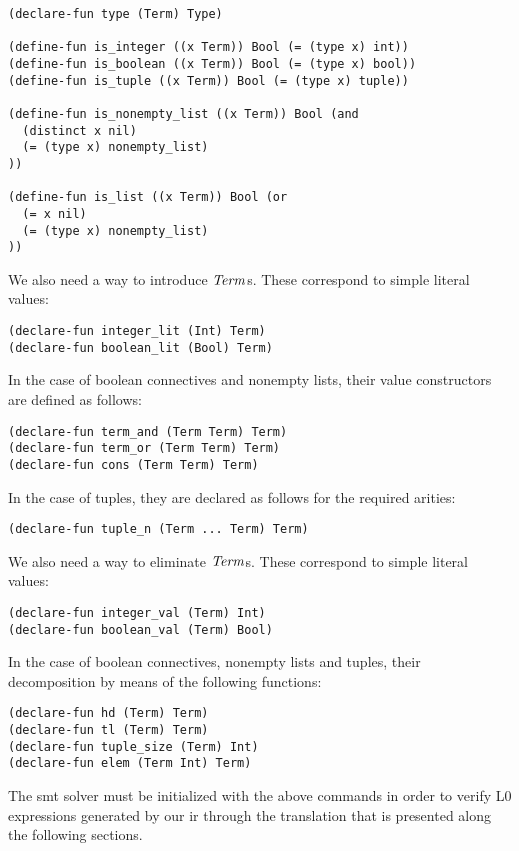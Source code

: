 \begin{verbatim}
(declare-fun type (Term) Type)

(define-fun is_integer ((x Term)) Bool (= (type x) int))
(define-fun is_boolean ((x Term)) Bool (= (type x) bool))
(define-fun is_tuple ((x Term)) Bool (= (type x) tuple))

(define-fun is_nonempty_list ((x Term)) Bool (and
  (distinct x nil) 
  (= (type x) nonempty_list)
))

(define-fun is_list ((x Term)) Bool (or 
  (= x nil) 
  (= (type x) nonempty_list)
))
\end{verbatim}

We also need a way to introduce $\mathit{Term}$s. These correspond to simple literal
values:

\begin{verbatim}
(declare-fun integer_lit (Int) Term)
(declare-fun boolean_lit (Bool) Term)
\end{verbatim}

In the case of boolean connectives and nonempty lists, their value constructors
are defined as follows:

\begin{verbatim}
(declare-fun term_and (Term Term) Term)
(declare-fun term_or (Term Term) Term)
(declare-fun cons (Term Term) Term)
\end{verbatim}

In the case of tuples, they are declared as follows for the required arities:

\begin{verbatim}
(declare-fun tuple_n (Term ... Term) Term)
\end{verbatim}

We also need a way to eliminate $\mathit{Term}$s. These correspond to simple literal
values:

\begin{verbatim}
(declare-fun integer_val (Term) Int)
(declare-fun boolean_val (Term) Bool)
\end{verbatim}

In the case of boolean connectives, nonempty lists and tuples, their
decomposition by means of the following functions:

\begin{verbatim}
(declare-fun hd (Term) Term)
(declare-fun tl (Term) Term)
(declare-fun tuple_size (Term) Int)
(declare-fun elem (Term Int) Term)
\end{verbatim}

The \acrshort{smt} solver must be initialized with the above commands in order
to verify L0 expressions generated by our \gls{ir} through the translation that
is presented along the following sections.

